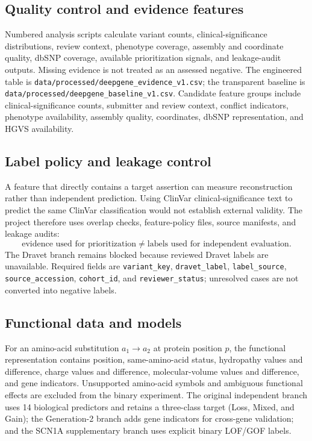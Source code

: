 \documentclass[12pt,a4paper]{article}
\newcommand{\code}[1]{\nolinkurl{#1}}
\begin{document}
\subsection{Quality control and evidence features}
Numbered analysis scripts calculate variant counts, clinical-significance distributions, review context, phenotype coverage, assembly and coordinate quality, dbSNP coverage, available prioritization signals, and leakage-audit outputs. Missing evidence is not treated as an assessed negative. The engineered table is \code{data/processed/deepgene\_evidence\_v1.csv}; the transparent baseline is \code{data/processed/deepgene\_baseline\_v1.csv}. Candidate feature groups include clinical-significance counts, submitter and review context, conflict indicators, phenotype availability, assembly quality, coordinates, dbSNP representation, and HGVS availability.

\subsection{Label policy and leakage control}
A feature that directly contains a target assertion can measure reconstruction rather than independent prediction. Using ClinVar clinical-significance text to predict the same ClinVar classification would not establish external validity. The project therefore uses overlap checks, feature-policy files, source manifests, and leakage audits:
\begin{equation}
\text{evidence used for prioritization} \ne \text{labels used for independent evaluation}.
\end{equation}
The Dravet branch remains blocked because reviewed Dravet labels are unavailable. Required fields are \code{variant\_key}, \code{dravet\_label}, \code{label\_source}, \code{source\_accession}, \code{cohort\_id}, and \code{reviewer\_status}; unresolved cases are not converted into negative labels.

\subsection{Functional data and models}
For an amino-acid substitution $a_1\rightarrow a_2$ at protein position $p$, the functional representation contains position, same-amino-acid status, hydropathy values and difference, charge values and difference, molecular-volume values and difference, and gene indicators. Unsupported amino-acid symbols and ambiguous functional effects are excluded from the binary experiment. The original independent branch uses 14 biological predictors and retains a three-class target (Loss, Mixed, and Gain); the Generation-2 branch adds gene indicators for cross-gene validation; and the SCN1A supplementary branch uses explicit binary LOF/GOF labels.
\end{document}
